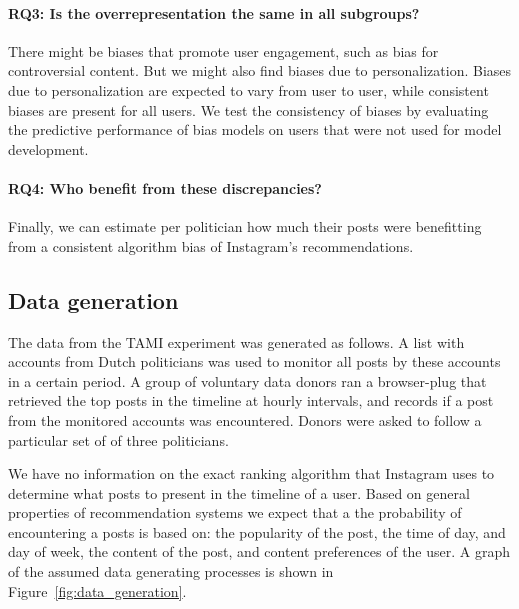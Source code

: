 \documentclass[a4paper]{article}
\begin{document}
\paragraph{RQ3: Is the overrepresentation the same in all subgroups?}
There might be biases that promote user engagement, such as bias for
controversial content. But we might also find biases due to personalization.
Biases due to personalization are expected to vary from user to user, while
consistent biases are present for all users. We test the consistency of
biases by evaluating the predictive performance of bias models on users that
were not used for model development.

\paragraph{RQ4: Who benefit from these discrepancies?}
Finally, we can estimate per politician how much their posts were benefitting
from a consistent algorithm bias of Instagram's recommendations.


\subsection{Data generation}
The data from the TAMI experiment was generated as follows. A list with
accounts from Dutch politicians was used to monitor all posts by these
accounts in a certain period. A group of voluntary data donors ran a
browser-plug that retrieved the top posts in the timeline at hourly
intervals, and records if a post from the monitored accounts was encountered.
Donors were asked to follow a particular set of of three politicians. 

We have no information on the exact ranking algorithm that Instagram uses to
determine what posts to present in the timeline of a user. Based on general
properties of recommendation systems we expect that a the probability of
encountering a posts is based on: the popularity of the post, the time of
day, and day of week, the content of the post, and content preferences of the
user. A graph of the assumed data generating processes is shown in
Figure~\ref{fig:data_generation}. 
\end{document}
